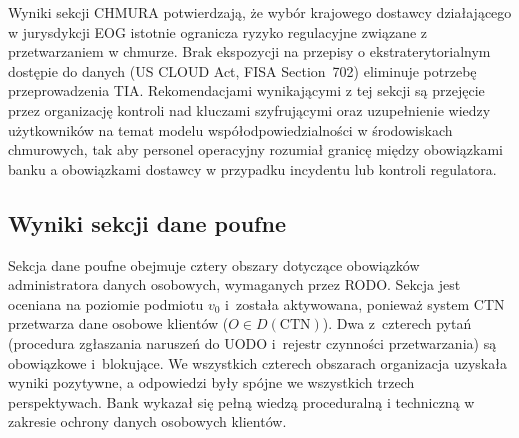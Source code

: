 Wyniki sekcji CHMURA potwierdzają, że wybór krajowego dostawcy działającego w jurysdykcji EOG istotnie ogranicza ryzyko regulacyjne związane z przetwarzaniem w chmurze. Brak ekspozycji na przepisy o ekstraterytorialnym dostępie do danych (US CLOUD Act, FISA Section~702) eliminuje potrzebę przeprowadzenia TIA. Rekomendacjami wynikającymi z tej sekcji są przejęcie przez organizację kontroli nad kluczami szyfrującymi oraz uzupełnienie wiedzy użytkowników na temat modelu współodpowiedzialności w środowiskach chmurowych, tak aby personel operacyjny rozumiał granicę między obowiązkami banku a obowiązkami dostawcy w przypadku incydentu lub kontroli regulatora.

\subsection{Wyniki sekcji dane poufne}

Sekcja dane poufne obejmuje cztery obszary dotyczące obowiązków administratora danych osobowych, wymaganych przez RODO. Sekcja jest oceniana na poziomie podmiotu $v_0$ i~została aktywowana, ponieważ system CTN przetwarza dane osobowe klientów ($O \in D(\text{CTN})$). Dwa z~czterech pytań (procedura zgłaszania naruszeń do UODO i~rejestr czynności przetwarzania) są obowiązkowe i~blokujące. We wszystkich czterech obszarach organizacja uzyskała wyniki pozytywne, a odpowiedzi były spójne we wszystkich trzech perspektywach. Bank wykazał się pełną wiedzą proceduralną i techniczną w zakresie ochrony danych osobowych klientów.

